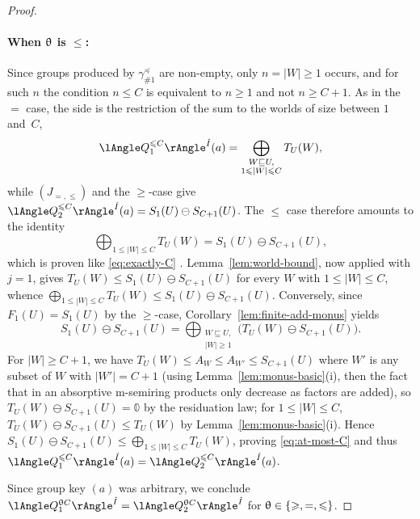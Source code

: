 \begin{proof}
\paragraph*{\textbf{When $\mathrel{\uptheta}$ is $\le$:}}
Since groups produced by $\gamma^{\preceq}_{\#1}$ are non-empty, only
$n=|W|\ge 1$ occurs, and for such $n$ the condition $n\le C$ is equivalent to
$n\ge 1$ and not $n\ge C+1$. As in the $=$ case, the  side is the
restriction of the sum to the worlds of size between $1$ and~$C$,
\[
\angsem{\hat I}{Q^{\le C}_1}(a)
=\bigoplus_{\substack{W\sqsubseteq U,\\ 1\le|W|\le C}} T_{U}(W),
\]
while $(J_{=,\le})$ and the $\ge$-case give
$\angsem{\hat I}{Q^{\le C}_2}(a)=S_1(U)\ominus S_{C+1}(U)$. The $\le$ case
therefore amounts to the identity
\begin{equation}\label{eq:at-most-C}
\bigoplus_{1\le|W|\le C} T_{U}(W)
=S_1(U)\ominus S_{C+1}(U),
\end{equation}
which is proven like \eqref{eq:exactly-C}
.
Lemma~\ref{lem:world-bound}, now applied with $j=1$, gives
$T_U(W)\le S_1(U)\ominus S_{C+1}(U)$ for every $W$ with $1\le|W|\le C$,
whence
$\bigoplus_{1\le|W|\le C}T_U(W)\le S_1(U)\ominus S_{C+1}(U)$.
Conversely, since $F_1(U)=S_1(U)$ by the $\ge$-case,
Corollary~\ref{lem:finite-add-monus} yields
\[
S_1(U)\ominus S_{C+1}(U)
=\bigoplus_{\substack{W\sqsubseteq U,\\|W|\ge 1}}\bigl(T_U(W)\ominus S_{C+1}(U)\bigr).
\]
For $|W|\ge C+1$, we have $T_U(W)\le A_W\le A_{W'}\le S_{C+1}(U)$ where
$W'$ is any subset of $W$ with $|W'|=C+1$ (using
Lemma~\ref{lem:monus-basic}(i), then the fact that in an absorptive m-semiring
products only decrease as factors are added), so
$T_U(W)\ominus S_{C+1}(U)=\mathbb 0$ by the residuation law; for
$1\le|W|\le C$, $T_U(W)\ominus S_{C+1}(U)\le T_U(W)$ by
Lemma~\ref{lem:monus-basic}(i). Hence
$S_1(U)\ominus S_{C+1}(U)\le\bigoplus_{1\le|W|\le C}T_U(W)$, proving
\eqref{eq:at-most-C} and thus
$\angsem{\hat I}{Q^{\le C}_1}(a)=\angsem{\hat I}{Q^{\le C}_2}(a)$.

\smallskip
Since group key $(a)$ was arbitrary, we conclude
$\angsem{\hat I}{Q^{\op C}_1}=\angsem{\hat I}{Q^{\op C}_2}$ for
${\mathrel{\uptheta}}\in\{\geqslant,=,\leqslant\}$.

\end{proof}
